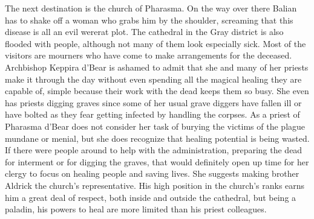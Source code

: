 The next destination is the church of Pharasma. On the way over there Balian has to shake off a woman who grabs him by the shoulder, screaming that this disease is all an evil wererat plot. The cathedral in the Gray district is also flooded with people, although not many of them look especially sick. Most of the visitors are mourners who have come to make arrangements for the deceased. Archbishop Keppira d'Bear is ashamed to admit that she and many of her priests make it through the day without even spending all the magical healing they are capable of, simple because their work with the dead keeps them so busy. She even has priests digging graves since some of her usual grave diggers have fallen ill or have bolted as they fear getting infected by handling the corpses. As a priest of Pharasma d'Bear does not consider her task of burying the victims of the plague mundane or menial, but she does recognize that healing potential is being wasted. If there were people around to help with the administration, preparing the dead for interment or for digging the graves, that would definitely open up time for her clergy to focus on healing people and saving lives. She suggests making brother Aldrick the church's representative. His high position in the church's ranks earns him a great deal of respect, both inside and outside the cathedral, but being a paladin, his powers to heal are more limited than his priest colleagues.\\

